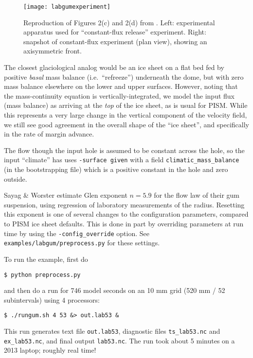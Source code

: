 \begin{figure}[ht]
\centering
\texttt{[image: labgumexperiment]}
\caption{Reproduction of Figures 2(c) and 2(d) from \cite{SayagWorster2013}.  Left: experimental  apparatus used for ``constant-flux release'' experiment.  Right: snapshot of constant-flux experiment (plan view), showing an axisymmetric front.}
\label{fig:labgumexperiment}
\end{figure}

The closest glaciological analog would be an ice sheet on a flat bed fed by positive \emph{basal} mass balance (i.e.~``refreeze'') underneath the dome, but with zero mass balance elsewhere on the lower and upper surfaces.  However, noting that the mass-continuity equation is vertically-integrated, we model the input flux (mass balance) as arriving at the \emph{top} of the ice sheet, as is usual for PISM.  While this represents a very large change in the vertical component of the velocity field, we still see good agreement in the overall shape of the ``ice sheet'', and specifically in the rate of margin advance.

The flow though the input hole is assumed to be constant across the hole, so the input ``climate'' has uses \texttt{-surface given} with a field \texttt{climatic_mass_balance} (in the bootstrapping file) which is a positive constant in the hole and zero outside.

Sayag \& Worster estimate Glen exponent $n = 5.9$ for the flow law of their gum suspension, using regression of laboratory measurements of the radius.  Resetting this exponent is one of several changes to the configuration parameters, compared to PISM ice sheet defaults.  This is done in part by overriding parameters at run time by using the \texttt{-config_override} option.  See \texttt{examples/labgum/preprocess.py} for these settings.

To run the example, first do
\begin{verbatim}
$ python preprocess.py
\end{verbatim}
and then do a run for 746 model seconds \cite{SayagWorster2013} on an 10 mm grid (520 mm / 52 subintervals) using 4 processors:
\begin{verbatim}
$ ./rungum.sh 4 53 &> out.lab53 &
\end{verbatim}
This run generates text file \texttt{out.lab53}, diagnostic files \texttt{ts_lab53.nc} and \texttt{ex_lab53.nc}, and final output \texttt{lab53.nc}.  The run took about 5 minutes on a 2013 laptop; roughly real time!

